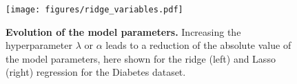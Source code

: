 \begin{figure}[bh]
\centering
    \texttt{[image: figures/ridge\_variables.pdf]}
    \caption{
    \textbf{Evolution of the model parameters.} Increasing the hyperparameter $\lambda$ or $\alpha$ leads to a reduction of the absolute value of the model parameters, here shown for the ridge (left) and Lasso (right) regression for the Diabetes dataset.
    }
\label{fig: Ridge Parameters}
\end{figure}
%
%
